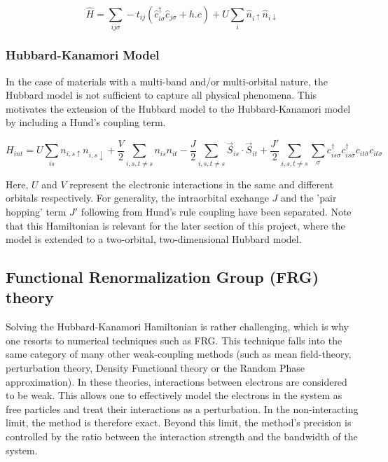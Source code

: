 \documentclass[11pt]{article}
\begin{document}
\begin{equation}\label{t Hubbard model}
    \hat{H} = \sum_{ij\sigma} -t_{ij}(\hat{c}_{i\sigma}^{\dagger}\hat{c}_{j \sigma} + h.c) 
    + U \sum_{i} \hat{n}_{i \uparrow} \hat{n}_{i \downarrow}
\end{equation}





\subsubsection{Hubbard-Kanamori Model}
\label{subsubsec: HKmodel}
In the case of materials with a multi-band and/or multi-orbital nature, the Hubbard model is not sufficient to capture all physical phenomena. This motivates the extension of the Hubbard model to the Hubbard-Kanamori model\cite{sherman2020hubbard} by including a Hund's coupling term.

\begin{equation} \label{Hubbard-Kanamori Model}
    H_{int} = U \sum_{is}n_{i,s\uparrow}n_{i,s\downarrow} + \frac{V}{2} \sum_{i,s,t \neq s} n_{is}n_{it} -\frac{J}{2} \sum_{i,s,t \neq s} \vec{S}_{is} \cdot \vec{S}_{it} 
    + \frac{J'}{2} \sum_{i,s,t \neq s} \sum_{\sigma} c_{is\sigma}^{\dagger}c_{is\bar{\sigma}}^{\dagger}c_{it\bar{\sigma}}c_{it\sigma}
\end{equation}

\noindent Here, $U$ and $V$ represent the electronic interactions in the same and different orbitals respectively. For generality, the intraorbital exchange $J$ and the 'pair hopping' term $J'$ following from Hund's rule coupling have been separated.  
Note that this Hamiltonian is relevant for the later section of this project, where the model is extended to a two-orbital, two-dimensional Hubbard model.

\subsection{Functional Renormalization Group (FRG) theory}

Solving the Hubbard-Kanamori Hamiltonian is rather challenging, which is why one resorts to numerical techniques such as FRG. This technique falls into the same category of many other weak-coupling methods (such as mean field-theory\cite{kadanoff2009more}, perturbation theory\cite{nagaosa2013quantum}, Density Functional theory\cite{kohn1965self} or the Random Phase approximation\cite{bohm1951collective}).
In these theories, interactions between electrons are considered to be weak. This allows one to effectively model the electrons in the system as free particles 
and treat their interactions as a perturbation. In the non-interacting limit, the method is therefore exact. Beyond this limit, the method's precision is controlled by the ratio between the interaction
strength and the bandwidth of the system. \par
\end{document}
